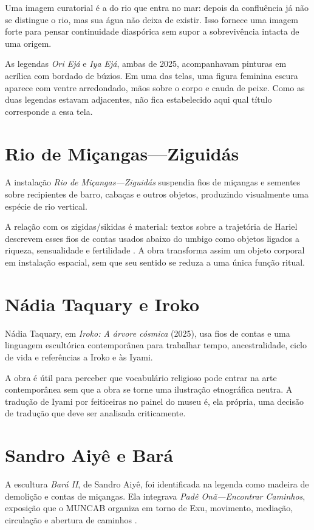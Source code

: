Uma imagem curatorial é a do
rio que entra no mar: depois da
confluência já não se distingue o rio, mas
sua água não deixa de existir.
Isso fornece uma imagem forte para pensar
continuidade diaspórica sem supor a
sobrevivência intacta de uma origem.

As legendas \emph{Ori Ejá} e \emph{Iya Ejá},
ambas de 2025, acompanhavam
pinturas em acrílica com bordado de búzios.
Em uma das telas, uma figura feminina
escura aparece
com ventre arredondado, mãos sobre
o corpo e cauda de peixe. Como as duas
legendas estavam adjacentes, não fica
estabelecido aqui qual título
corresponde a essa tela.

\section{Rio de Miçangas---Ziguidás}
\label{section-rio-micangas-ziguidas}
A instalação \emph{Rio de
Miçangas---Ziguidás} suspendia fios de
miçangas e
sementes sobre recipientes de barro, cabaças
e outros objetos, produzindo
visualmente uma espécie de rio vertical.

A relação com os zigidas/sikidas é
material: textos sobre a
trajetória de Hariel descrevem esses fios de
contas usados abaixo do umbigo
como objetos ligados a riqueza, sensualidade
e fertilidade
\cite{hariel-zigida}. A obra
transforma assim um objeto corporal em
instalação espacial, sem que seu sentido
se reduza a uma única função ritual.

\section{Nádia Taquary e Iroko}
\label{section-nadia-taquary-iroko}
Nádia Taquary, em \emph{Iroko: A árvore
cósmica} (2025), usa fios de contas e
uma linguagem escultórica contemporânea para
trabalhar tempo, ancestralidade,
ciclo de vida e referências a Iroko e às
Iyami.

A obra é útil para perceber que vocabulário
religioso pode entrar na arte
contemporânea sem que a obra se torne uma
ilustração etnográfica neutra. A
tradução de Iyami por feiticeiras no painel
do museu é, ela própria, uma
decisão de tradução que deve ser analisada
criticamente.

\section{Sandro Aiyê e Bará}
\label{section-sandro-aiye-bara}
A escultura \emph{Bará II}, de Sandro Aiyê,
foi identificada na legenda como
madeira de demolição e contas de miçangas.
Ela integrava
\emph{Padê Onã---Encontrar Caminhos},
exposição que o MUNCAB organiza em torno
de Exu, movimento, mediação, circulação e
abertura de caminhos
\cite{muncab2026padeona}.

